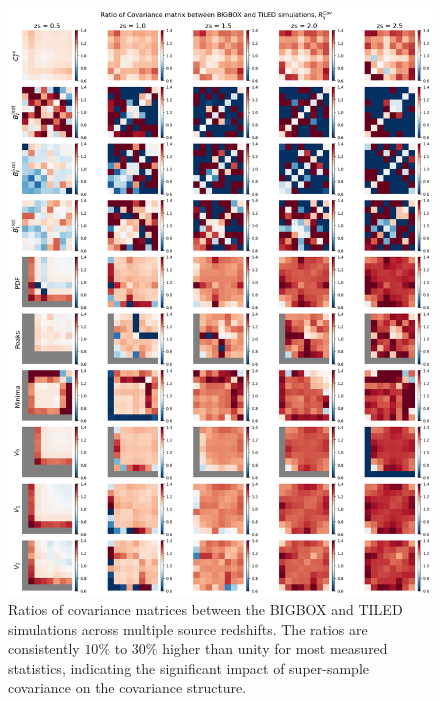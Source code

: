 \begin{figure}[p]
    \centering
    \includegraphics[width=\textwidth]{figures/results/cov_ratio.png}
    \caption[Ratios of Covariance Matrices between BIGBOX and TILED Simulations]{Ratios of covariance matrices between the BIGBOX and TILED simulations across multiple source redshifts. The ratios are consistently $10\%$ to $30\%$ higher than unity for most measured statistics, indicating the significant impact of super-sample covariance on the covariance structure.}
    \label{fig:cov_ratio_main}
\end{figure}

